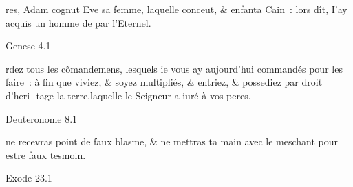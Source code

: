 \documentclass[paper=a6,pagesize=pdftex]{scrbook}
\newcommand{\bibleref}[1]{\begin{flushright}\tiny{#1}\end{flushright}}
\begin{document}
\parbox{6cm}{
res, Adam cognut Eve sa fem\-me, laquelle conceut, \& enfan\-ta
 Cain~: lors dît, I'ay acquis un homme de par l'Eternel.
 \bibleref{Genese 4.1}

\vfill

rdez tous les c\~omandemens, \linebreak
 lesquels ie vous ay aujourd'hui \linebreak
 commandés pour les faire~: à  \linebreak
 fin que viviez, \& soyez multipliés, \& \linebreak
 entriez, \& possediez par droit d'heri- \linebreak
 tage la terre,laquelle le Seigneur a iuré \linebreak à vos peres.
 \bibleref{Deuteronome 8.1}

\vfill

 ne recevras point de faux \linebreak
 blasme, \& ne mettras ta main \linebreak
 avec le meschant pour estre \linebreak
 faux tesmoin.
 \bibleref{Exode 23.1}
}
\end{document}
